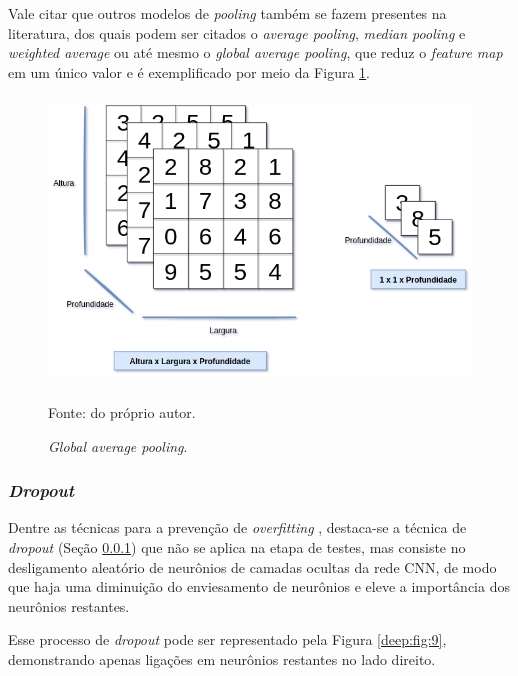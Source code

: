 \begin{sloppypar}
Vale citar que outros modelos de \textit{pooling} também se fazem presentes na literatura, dos quais podem ser citados o \textit{average pooling}, \textit{median pooling} e \textit{weighted average} \cite{Goodfellow2016} ou até mesmo o \textit{global average pooling}, que reduz o \textit{feature map} em um único valor e é exemplificado por meio da Figura \ref{deep:fig:8}.
\end{sloppypar}

\begin{figure}[H]
    \centering
    \caption{\textit{Global average pooling}.}
    \includegraphics[height=3in]{recursos/imagens/deep/global_average_pooling.png}
    \label{deep:fig:8}
    
    \vspace*{1 cm}
     Fonte: do próprio autor.
\end{figure}

\subsubsection{\textit{Dropout}}
\label{deep:dropout}

\begin{sloppypar}
Dentre as técnicas para a prevenção de \textit{overfitting} \cite{Goodfellow2016}, destaca-se a técnica de \textit{dropout} (Seção \ref{deep:dropout}) que não se aplica na etapa de testes, mas consiste no desligamento aleatório de neurônios de camadas ocultas da rede CNN, de modo que haja uma diminuição do enviesamento de neurônios e eleve a importância dos neurônios restantes.
\end{sloppypar}

Esse processo de \textit{dropout} pode ser representado pela Figura \ref{deep:fig:9}, demonstrando apenas ligações em neurônios restantes no lado direito.

